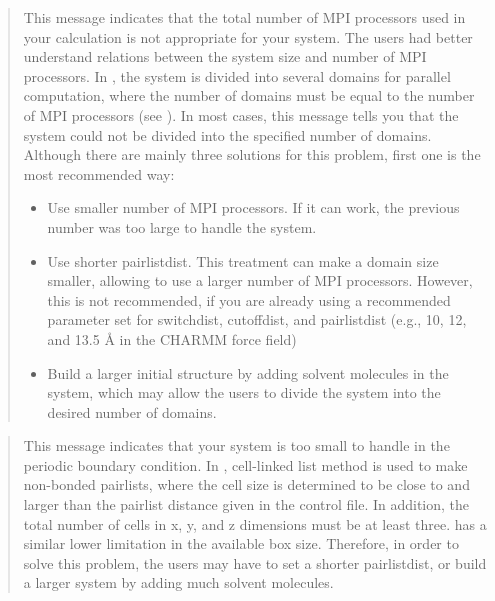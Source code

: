 \documentclass[a4paper,11pt,oneside,english]{sphinxmanual}
\begin{document}
\begin{quote}

This message indicates that the total number of MPI processors used in your calculation is not appropriate for your system.
The users had better understand relations between the system size and number of MPI processors.
In , the system is divided into several domains for parallel computation,
where the number of domains must be equal to the number of MPI processors (see {\hyperref[\detokenize{02_Available_Programs:available-programs}]{}}).
In most cases, this message tells you that the system could not be divided into the specified number of domains.
Although there are mainly three solutions for this problem, first one is the most recommended way:
\begin{itemize}
\item {} 
Use smaller number of MPI processors. If it can work, the previous number was too large to handle the system.

\item {} 
Use shorter pairlistdist. This treatment can make a domain size smaller, allowing to use a larger number of MPI processors.
However, this is not recommended, if you are already using a recommended parameter set for
switchdist, cutoffdist, and pairlistdist (e.g., 10, 12, and 13.5 \(\text{\AA}\) in the CHARMM force field)

\item {} 
Build a larger initial structure by adding solvent molecules in the system,
which may allow the users to divide the system into the desired number of domains.

\end{itemize}
\end{quote}

\begin{quote}

This message indicates that your system is too small to handle in the periodic boundary condition.
In , cell-linked list method is used to make non-bonded pairlists,
where the cell size is determined to be close to and larger than the pairlist distance given in the control file.
In addition, the total number of cells in x, y, and z dimensions must be at least three.
 has a similar lower limitation in the available box size.
Therefore, in order to solve this problem, the users may have to set a shorter pairlistdist,
or build a larger system by adding much solvent molecules.
\end{quote}
\end{document}
